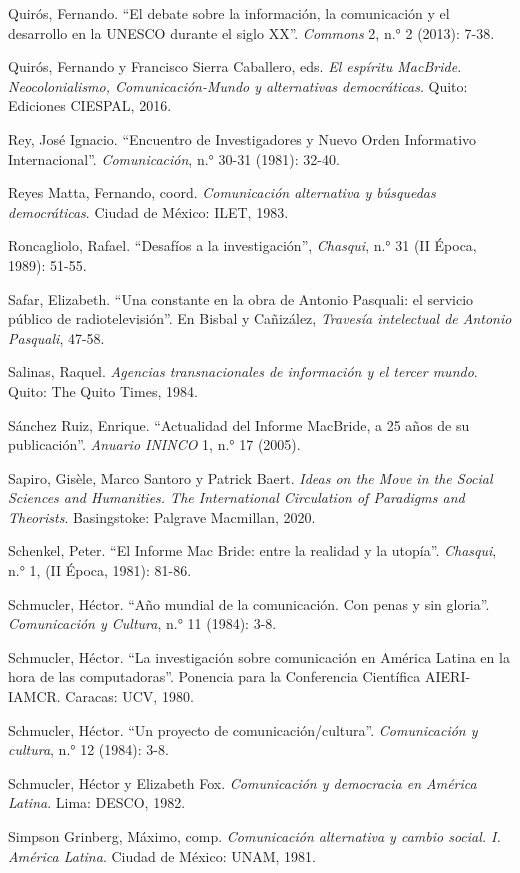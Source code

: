 \documentclass{tufte-handout}
\begin{document}
\begin{hangparas}{.25in}{1}
Quirós, Fernando. ``El debate sobre la información, la comunicación y el
desarrollo en la UNESCO durante el siglo XX''. \emph{Commons} 2, n.° 2
(2013): 7-38.

Quirós, Fernando y Francisco Sierra Caballero, eds. \emph{El espíritu
MacBride. Neocolonialismo, Comunicación-Mundo y alternativas
democráticas}. Quito: Ediciones CIESPAL, 2016.

Rey, José Ignacio. ``Encuentro de Investigadores y Nuevo Orden
Informativo Internacional''. \emph{Comunicación}, n.° 30-31 (1981):
32-40.

Reyes Matta, Fernando, coord. \emph{Comunicación alternativa y búsquedas
democráticas}. Ciudad de México: ILET, 1983.

Roncagliolo, Rafael. ``Desafíos a la investigación'', \emph{Chasqui},
n.° 31 (II Época, 1989): 51-55.

Safar, Elizabeth. ``Una constante en la obra de Antonio Pasquali: el
servicio público de radiotelevisión''. En Bisbal y Cañizález,
\emph{Travesía intelectual de Antonio Pasquali}, 47-58.

Salinas, Raquel. \emph{Agencias transnacionales de información y el
tercer mundo}. Quito: The Quito Times, 1984.

Sánchez Ruiz, Enrique. ``Actualidad del Informe MacBride, a 25 años de
su publicación''. \emph{Anuario ININCO} 1, n.° 17 (2005).

Sapiro, Gisèle, Marco Santoro y Patrick Baert. \emph{Ideas on the Move
in the Social Sciences and Humanities. The International Circulation of
Paradigms and Theorists}. Basingstoke: Palgrave Macmillan, 2020.

Schenkel, Peter. ``El Informe Mac Bride: entre la realidad y la
utopía''. \emph{Chasqui}, n.° 1, (II Época, 1981): 81-86.

Schmucler, Héctor. ``Año mundial de la comunicación. Con penas y sin
gloria''. \emph{Comunicación y Cultura}, n.° 11 (1984): 3-8.

Schmucler, Héctor. ``La investigación sobre comunicación en América
Latina en la hora de las computadoras''. Ponencia para la Conferencia
Científica AIERI-IAMCR. Caracas: UCV, 1980.

Schmucler, Héctor. ``Un proyecto de comunicación/cultura''.
\emph{Comunicación y cultura}, n.° 12 (1984): 3-8.

Schmucler, Héctor y Elizabeth Fox. \emph{Comunicación y democracia en
América Latina}. Lima: DESCO, 1982.

Simpson Grinberg, Máximo, comp. \emph{Comunicación alternativa y cambio
social. I. América Latina}. Ciudad de México: UNAM, 1981.


\end{hangparas}
\end{document}
